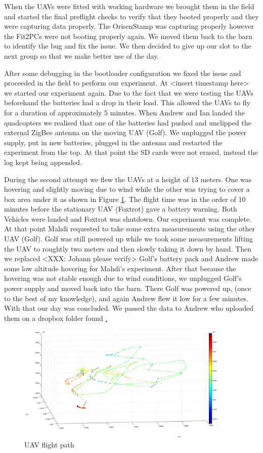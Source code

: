 When the UAVs were fitted with working hardware we brought them in the field and
started the final preflight checks to verify that they booted properly and they
were capturing data properly. The OrisenStamp was capturing properly however the
Fit2PCs were not booting properly again. We moved them back to the barn to
identify the bug and fix the issue. We then decided to give up our slot to the
next group so that we make better use of the day.

After some debugging in the bootloader configuration we fixed the issue and
proceeded in the field to perform our experiment. At <insert timestamp here> we
started our experiment again. Due to the fact that we were testing the UAVs
beforehand the batteries had a drop in their load. This allowed the UAVs to
fly for a duration of approximately 5 minutes. When Andrew and Ian landed
the quadcopters we realised that one of the batteries had pushed and unclipped
the external ZigBee antenna on the moving UAV (Golf). We unplugged the power
supply, put in new batteries, plugged in the antenna and restarted the
experiment from the top. At that point the SD cards were not erased, instead the
log kept being appended.

During the second attempt we flew the UAVs at a height of 13 meters. One was
hovering and slightly moving due to wind while the other was trying to cover a
box area under it as shown in Figure \ref{fig:flight_path_angled}. The flight time
was in the order of 10 minutes before the stationary UAV (Foxtrot) gave a
battery warning. Both Vehicles were landed and Foxtrot was shutdown. Our
experiment was complete. At that point Mahdi requested to take some extra
measurements using the other UAV (Golf). Golf was still powered up while we took
some measurements lifting the UAV to roughtly two meters and then slowly taking
it down by hand. Then we replaced <XXX: Johann please verify> Golf's battery
pack and Andrew made some low altitude hovering for Mahdi's experiment. After
that because the hovering was not stable enough due to wind conditions, we
unplugged Golf's power supply and moved back into the barn. There Golf was
powered up, (once to the best of my knowledge), and again Andrew flew it low for
a few minutes. With that our day was concluded. We passed the data to Andrew
who uploaded them on a dropbox folder found \href{https://db.tt/jwxhmVhr}.

\begin{figure}[h!]
    \centering
    \includegraphics[width=0.9\textwidth]{files/angled}
    \caption{UAV flight path}
    \label{fig:flight_path_angled}
\end{figure}


